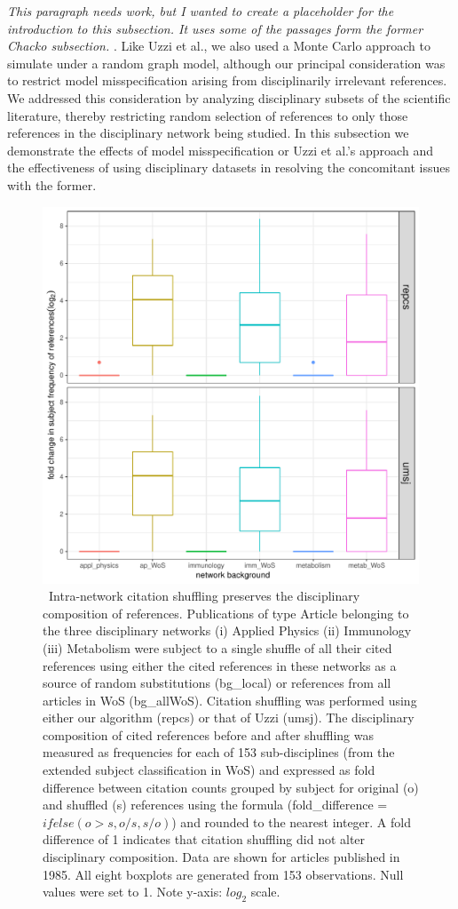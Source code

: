 \documentclass[NETN]{stjour}
\begin{document}
\emph{This paragraph needs work, but I wanted to create a placeholder for the introduction to this subsection.  It uses some of the passages form the former Chacko subsection.} . Like Uzzi et al., we also used a Monte Carlo approach to simulate under a random graph model, although our principal consideration was to restrict model misspecification arising from disciplinarily irrelevant references. We addressed this consideration by analyzing disciplinary subsets of the scientific literature, thereby restricting random selection of references to only those references in the disciplinary network being studied.  In this subsection we demonstrate the effects of model misspecification or Uzzi et al.'s approach and the effectiveness of using disciplinary datasets in resolving the concomitant issues with the former.

\begin{figure}%
\centering
\includegraphics[width=0.8\linewidth]{background-effect}     
\caption{\ Intra-network citation shuffling preserves the disciplinary composition of references. Publications of type Article belonging to the three disciplinary networks (i) Applied Physics (ii) Immunology (iii) Metabolism were subject to a single shuffle of all their cited references using either the cited references in these networks as a source of random substitutions (bg\_local) or references from all articles in WoS (bg\_allWoS). Citation shuffling was performed using either our algorithm (repcs) or that of Uzzi (umsj). The disciplinary composition of cited references before and after shuffling was measured as frequencies for each of 153 sub-disciplines (from the extended subject classification in WoS) and expressed as fold difference between citation counts grouped by subject for original (o) and shuffled (s) references using the formula (fold\_difference = $ifelse(o > s, o/s, s/o)$) and rounded to the nearest integer. A fold difference of 1 indicates that citation shuffling did not alter disciplinary composition. Data are shown for articles published in 1985. All eight boxplots are generated from 153 observations. Null values were set to 1. Note y-axis: $log_2$ scale.} 
\label{fig:be}
\end{figure}
\end{document}
